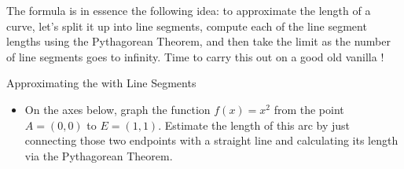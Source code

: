 The  formula is in essence the following idea: to approximate the length of a curve, let's split it up into line segments, compute each of the line segment lengths using the Pythagorean Theorem, and then take the limit as the number of line segments goes to infinity.  Time to carry this out on a good old vanilla !
\begin{exercise}{Approximating the  with Line Segments \Coffeecup \Coffeecup }

\begin{itemize}
\item On the axes below, graph the function $f(x)=x^2$ from the point $A=(0,0)$ to $E=(1,1)$.  Estimate the length of this arc by just connecting those two endpoints with a straight line and calculating its length via the Pythagorean Theorem.


\end{itemize}
\end{exercise}
